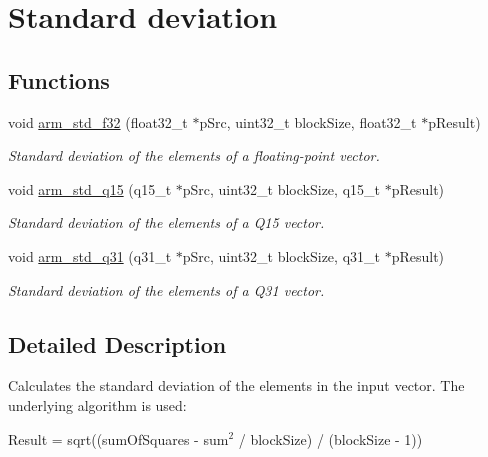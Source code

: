 \hypertarget{group___s_t_d}{\section{Standard deviation}
\label{group___s_t_d}
}
\subsection*{Functions}
\begin{DoxyCompactItemize}
\item 
void \hyperlink{group___s_t_d_ga4969b5b5f3d001377bc401a3ee99dfc2}{arm\-\_\-std\-\_\-f32} (float32\-\_\-t $\ast$p\-Src, uint32\-\_\-t block\-Size, float32\-\_\-t $\ast$p\-Result)
\begin{DoxyCompactList}\small\item\em Standard deviation of the elements of a floating-\/point vector. \end{DoxyCompactList}\item 
void \hyperlink{group___s_t_d_gaf9d27afa9928ff28a63cd98ea9218a72}{arm\-\_\-std\-\_\-q15} (q15\-\_\-t $\ast$p\-Src, uint32\-\_\-t block\-Size, q15\-\_\-t $\ast$p\-Result)
\begin{DoxyCompactList}\small\item\em Standard deviation of the elements of a Q15 vector. \end{DoxyCompactList}\item 
void \hyperlink{group___s_t_d_ga39495e74f96116178be085c9dc7742f5}{arm\-\_\-std\-\_\-q31} (q31\-\_\-t $\ast$p\-Src, uint32\-\_\-t block\-Size, q31\-\_\-t $\ast$p\-Result)
\begin{DoxyCompactList}\small\item\em Standard deviation of the elements of a Q31 vector. \end{DoxyCompactList}\end{DoxyCompactItemize}


\subsection{Detailed Description}
Calculates the standard deviation of the elements in the input vector. The underlying algorithm is used\-:


\begin{DoxyPre}   
    Result = sqrt((sumOfSquares - sum$^{\mbox{2}}$  / blockSize) / (blockSize - 1))\end{DoxyPre}



